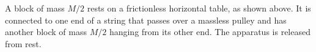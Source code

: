 \documentclass{../../oss-apphys-exam}
\begin{document}
\begin{questions}
%    
%
%    
%    

  \question A block of mass $M/2$ rests on a frictionless horizontal table, as
  shown above. It is connected to one end of a string that passes over a
  massless pulley and has another block of mass $M/2$ hanging from its other
  end. The apparatus is released from rest.
  \begin{parts}

\end{parts}
\end{questions}
\end{document}
